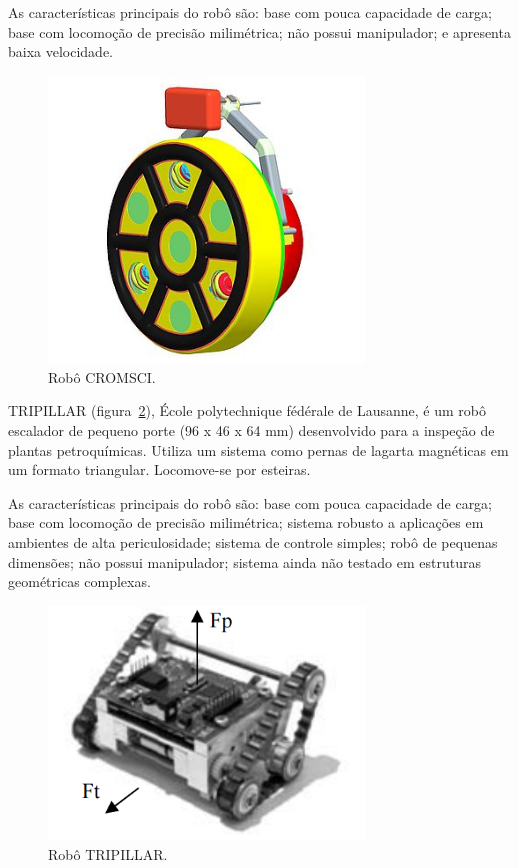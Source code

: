 As características principais do robô são: base com pouca capacidade de
carga; base com locomoção de precisão milimétrica; não possui manipulador; e
apresenta baixa velocidade.

\begin{figure}[ht]
\centering
\includegraphics[width=8.4cm]{figs/climbers/cromsci.jpg}
\caption{Robô CROMSCI.}
\label{cromsci}
\end{figure}

TRIPILLAR (figura~\ref{tripillar}), École polytechnique fédérale de Lausanne, é
um robô escalador de pequeno porte (96 x 46 x 64 mm) desenvolvido para a inspeção de plantas
petroquímicas. Utiliza um sistema como pernas de lagarta magnéticas em um
formato triangular. Locomove-se por esteiras.

As características principais do robô são: base com pouca capacidade de
carga; base com locomoção de precisão milimétrica; sistema robusto a aplicações
em ambientes de alta periculosidade; sistema de controle simples; robô de
pequenas dimensões; não possui manipulador; sistema ainda não testado em estruturas geométricas complexas.


\begin{figure}[ht]
\centering
\includegraphics[width=8.4cm]{figs/climbers/tripillar.png}
\caption{Robô TRIPILLAR.}
\label{tripillar}
\end{figure}
   
